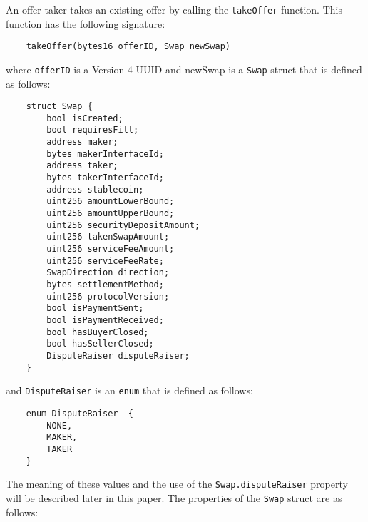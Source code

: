 \documentclass[11pt]{article}
\begin{document}
    An offer taker takes an existing offer by calling the \verb|takeOffer| function.
    This function has the following signature:
    \begin{verbatim}
    takeOffer(bytes16 offerID, Swap newSwap)
    \end{verbatim}
    where \verb|offerID| is a Version-4 UUID and newSwap is a \verb|Swap| struct that is defined as
    follows:
    \begin{verbatim}
    struct Swap {
        bool isCreated;
        bool requiresFill;
        address maker;
        bytes makerInterfaceId;
        address taker;
        bytes takerInterfaceId;
        address stablecoin;
        uint256 amountLowerBound;
        uint256 amountUpperBound;
        uint256 securityDepositAmount;
        uint256 takenSwapAmount;
        uint256 serviceFeeAmount;
        uint256 serviceFeeRate;
        SwapDirection direction;
        bytes settlementMethod;
        uint256 protocolVersion;
        bool isPaymentSent;
        bool isPaymentReceived;
        bool hasBuyerClosed;
        bool hasSellerClosed;
        DisputeRaiser disputeRaiser;
    }
    \end{verbatim}
    and \verb|DisputeRaiser| is an \verb|enum| that is defined as follows:
    \begin{verbatim}
    enum DisputeRaiser  {
        NONE,
        MAKER,
        TAKER
    }
    \end{verbatim}
    The meaning of these values and the use of the \verb|Swap.disputeRaiser| property will be
    described later in this paper.
    The properties of the \verb|Swap| struct are as follows:
\end{document}

